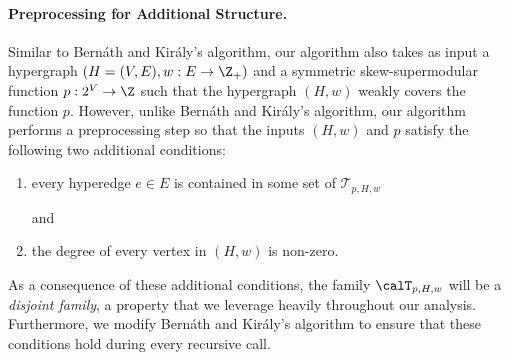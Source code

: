 \documentclass{article}
\newcommand{\maximalTightSetFamily}[1]{\ensuremath{\calT_{#1}}\xspace}
\newcommand{\shubhang}[1]{{\color{blue}[{\tiny Shubhang: \bf #1}]\marginpar{\color{blue}*}}}
\begin{document}
\paragraph{Preprocessing for Additional Structure.}
Similar to Bern\'{a}th and Kir\'{a}ly's algorithm, our algorithm also takes as input a hypergraph $(H=(V, E), w: E\rightarrow \Z_+)$ and a symmetric skew-supermodular function $p: 2^V\rightarrow \Z$ such that the hypergraph $(H,w)$ weakly covers the function $p$. 
However, unlike Bern\'{a}th and Kir\'{a}ly's algorithm, our algorithm performs a preprocessing step so that the inputs $(H,w)$ and $p$ satisfy the following two additional conditions: 
\begin{enumerate}[label=(\alph*)]
    \item \hypertarget{WeakToStrong(a)}{every hyperedge $e\in E$ is contained in some set of $\mathcal{T}_{p, H, w}$} and 
    \item \hypertarget{WeakToStrong(b)}{the degree of every vertex in $(H, w)$ is non-zero.}
\end{enumerate}
As a consequence of these additional conditions, the family $\maximalTightSetFamily{p, H, w}$ will be a \emph{disjoint family},  
a property that we leverage heavily throughout our analysis.
Furthermore, we modify Bern\'{a}th and Kir\'{a}ly's algorithm to ensure that these conditions hold during every recursive call.
\end{document}

